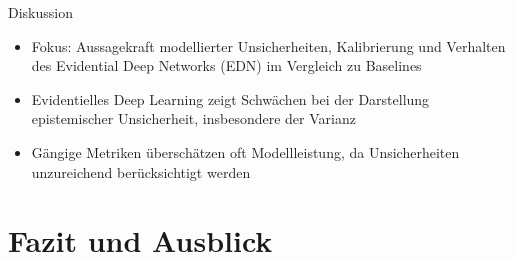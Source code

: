 \documentclass[10pt,a4paper,aspectratio=169]{beamer}
\begin{document}
\begin{frame}{Diskussion}
	\begin{itemize}
		\item Fokus: Aussagekraft modellierter Unsicherheiten, Kalibrierung und Verhalten des Evidential Deep Networks (EDN) im Vergleich zu Baselines
		\item Evidentielles Deep Learning zeigt Schwächen bei der Darstellung epistemischer Unsicherheit, insbesondere der Varianz \parencite{Jurgens.}
		\item Gängige Metriken überschätzen oft Modellleistung, da Unsicherheiten unzureichend berücksichtigt werden \parencite{Herd04082024}
	\end{itemize}
\end{frame}



\section[| 5: Fazit, Ausblick]{Fazit und Ausblick}
\end{document}
